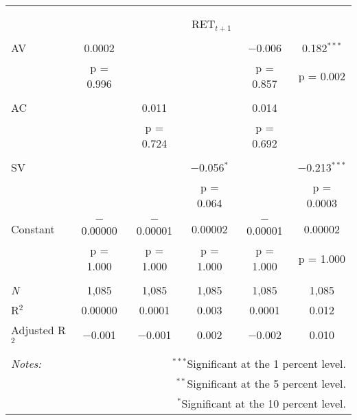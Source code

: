 
\begin{tabular}{@{\extracolsep{5pt}}lccccc} 
\\[-1.8ex]\hline 
\hline \\[-1.8ex] 
\\[-1.8ex] & \multicolumn{5}{c}{RET$_{t+1}$} \\ 
\hline \\[-1.8ex] 
 AV & 0.0002 &  &  & $-$0.006 & 0.182$^{***}$ \\ 
  & p = 0.996 &  &  & p = 0.857 & p = 0.002 \\ 
  & & & & & \\ 
 AC &  & 0.011 &  & 0.014 &  \\ 
  &  & p = 0.724 &  & p = 0.692 &  \\ 
  & & & & & \\ 
 SV &  &  & $-$0.056$^{*}$ &  & $-$0.213$^{***}$ \\ 
  &  &  & p = 0.064 &  & p = 0.0003 \\ 
  & & & & & \\ 
 Constant & $-$0.00000 & $-$0.00001 & 0.00002 & $-$0.00001 & 0.00002 \\ 
  & p = 1.000 & p = 1.000 & p = 1.000 & p = 1.000 & p = 1.000 \\ 
  & & & & & \\ 
\textit{N} & 1,085 & 1,085 & 1,085 & 1,085 & 1,085 \\ 
R$^{2}$ & 0.00000 & 0.0001 & 0.003 & 0.0001 & 0.012 \\ 
Adjusted R$^{2}$ & $-$0.001 & $-$0.001 & 0.002 & $-$0.002 & 0.010 \\ 
\hline 
\hline \\[-1.8ex] 
\textit{Notes:} & \multicolumn{5}{r}{$^{***}$Significant at the 1 percent level.} \\ 
 & \multicolumn{5}{r}{$^{**}$Significant at the 5 percent level.} \\ 
 & \multicolumn{5}{r}{$^{*}$Significant at the 10 percent level.} \\ 
\end{tabular} 
